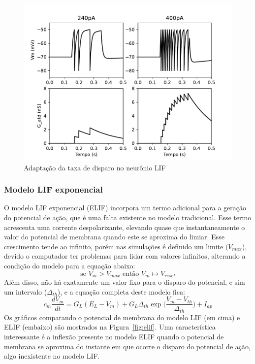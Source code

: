 \begin{figure}[tb]
	\centering
	\caption{Adaptação da taxa de disparo no neurônio LIF}
	\label{fig:lifatd}
	\includegraphics[width=0.7\linewidth]{figs/lif_atd}
\end{figure}

\subsubsection{Modelo LIF exponencial}
O modelo LIF exponencial (ELIF) incorpora um termo adicional para a geração do potencial de ação, que é uma falta existente no modelo tradicional. Esse termo acrescenta uma corrente despolarizante, elevando quase que instantaneamente o valor do potencial de membrana quando este se aproxima do limiar. Esse crescimento tende ao infinito, porém nas simulações é definido um limite ($V_{max}$), devido o computador ter problemas para lidar com valores infinitos, alterando a condição do modelo para a equação abaixo:
\begin{equation}\label{eq:elif_cond}
	\text{se } V_m > V_{max} \text{ então } V_m\mapsto V_{reset}
\end{equation}
Além disso, não há exatamente um valor fixo para o disparo do potencial, e sim um intervalo ($\Delta_{th}$), e a equação completa deste modelo fica:
\begin{equation}\label{eq:elif}
	c_m\frac{dV_m}{dt} = G_L(E_L-V_m) + G_L\Delta_{th}\exp\Big(\frac{V_m-V_{th}}{\Delta_{th}}\Big) + I_{ap}
\end{equation}
Os gráficos comparando o potencial de membrana do modelo LIF (em cima) e ELIF (embaixo) são mostrados na Figura~\ref{fig:elif}. Uma característica interessante é a inflexão presente no modelo ELIF quando o potencial de membrana se aproxima do instante em que ocorre o disparo do potencial de ação, algo inexistente no modelo LIF.

